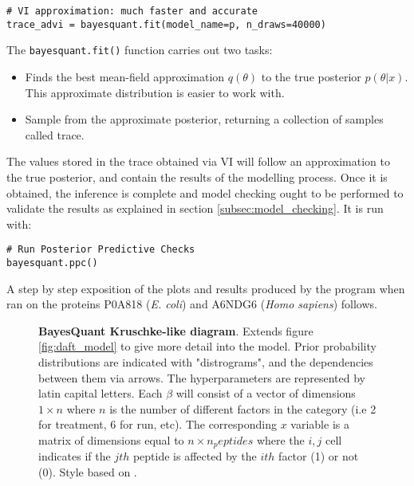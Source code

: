 \begin{verbatim}
# VI approximation: much faster and accurate
trace_advi = bayesquant.fit(model_name=p, n_draws=40000)
\end{verbatim}

The \texttt{bayesquant.fit()} function carries out two tasks:

\begin{itemize}
\item Finds the best mean-field approximation $q(\theta)$ to the true posterior $p(\theta|x)$. This approximate distribution is easier to work with.
\item Sample from the approximate posterior, returning a collection of samples called trace.
\end{itemize}

The values stored in the trace obtained via VI will follow an approximation to the true posterior, and contain the results of the modelling process. Once it is obtained, the inference is complete and model checking ought to be performed to validate the results as explained in section \ref{subsec:model_checking}. It is run with:

\begin{verbatim}
# Run Posterior Predictive Checks
bayesquant.ppc()
\end{verbatim}

A step by step exposition of the plots and results produced by the program when ran on the proteins  P0A818 (\textit{E. coli}) and A6NDG6 (\textit{Homo sapiens}) follows.

\begin{figure}[!h]

\caption[BayesQuant Kruschke-like diagram]{\textbf{BayesQuant Kruschke-like diagram}. Extends figure \ref{fig:daft_model} to give more detail into the model. Prior probability distributions are indicated with "distrograms", and the dependencies between them via arrows. The hyperparameters are represented by latin capital letters. Each $\beta$ will consist of a vector of dimensions $1 \times n$ where $n$ is the number of different factors in the category (i.e 2 for treatment, 6 for run, etc). The corresponding $x$ variable is a matrix of dimensions equal to $n \times n_peptides$ where the $i,j$ cell indicates if the $jth$ peptide is affected by the $ith$ factor (1) or not (0). Style based on \cite{Kruschke}.}
\label{fig:dbda}
\end{figure}

